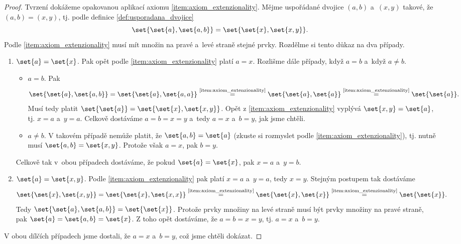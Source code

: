 \begin{proof}
    Tvrzení dokážeme opakovanou aplikací axiomu \ref{item:axiom_extenzionality}. Mějme uspořádané dvojice $(a,b)$ a~$(x,y)$ takové, že $(a,b)=(x,y)$, tj. podle definice \ref{def:usporadana_dvojice}
    \begin{equation*}
        \set{\set{a},\set{a,b}}=\set{\set{x},\set{x,y}}.
    \end{equation*}
    Podle \ref{item:axiom_extenzionality} musí mít množin na pravé a~levé straně stejné prvky. Rozdělme si tento důkaz na dva případy.
    \begin{enumerate}[label=(\alph*)]
        \item $\set{a}=\set{x}$. Pak opět podle \ref{item:axiom_extenzionality} platí $a=x$. Rozlišme dále případy, když $a=b$ a~když $a\neq b$.
        \begin{itemize}
            \item $a=b$. Pak
            \begin{equation*}
                \set{\set{a},\set{a,b}}=\set{\set{a},\set{a,a}}\stackrel{\text{\ref{item:axiom_extenzionality}}}{=}\set{\set{a},\set{a}}\stackrel{\text{\ref{item:axiom_extenzionality}}}{=}\set{\set{a}}.
            \end{equation*}
            Musí tedy platit $\set{\set{a}}=\set{\set{x},\set{x,y}}$. Opět z \ref{item:axiom_extenzionality} vyplývá $\set{x,y}=\set{a}$, tj. $x=a$ a~$y=a$. Celkově dostáváme $a=b=x=y$ a~tedy $a=x$ a~$b=y$, jak jsme chtěli.
            \item $a\neq b$. V takovém případě nemůže platit, že $\set{a,b}=\set{a}$ (zkuste si rozmyslet podle \ref{item:axiom_extenzionality}), tj. nutně musí $\set{a,b}=\set{x,y}$. Protože však $a=x$, pak $b=y$.
        \end{itemize}
        Celkově tak v~obou případech dostáváme, že pokud $\set{a}=\set{x}$, pak $x=a$ a~$y=b$.
        \item $\set{a}=\set{x,y}$. Podle \ref{item:axiom_extenzionality} pak platí $x=a$ a~$y=a$, tedy $x=y$. Stejným postupem tak dostáváme
        \begin{equation*}
            \set{\set{x},\set{x,y}}=\set{\set{x},\set{x,x}}\stackrel{\text{\ref{item:axiom_extenzionality}}}{=}\set{\set{x},\set{x}}\stackrel{\text{\ref{item:axiom_extenzionality}}}{=}\set{\set{x}}.
        \end{equation*}
        Tedy $\set{\set{a},\set{a,b}}=\set{\set{x}}$. Protože prvky množiny na levé straně musí být prvky množiny na pravé straně, pak $\set{a}=\set{a,b}=\set{x}$. Z toho opět dostáváme, že $a=b=x=y$, tj. $a=x$ a~$b=y$.
    \end{enumerate}
    V obou dílčích případech jsme dostali, že $a=x$ a~$b=y$, což jsme chtěli dokázat.
\end{proof}